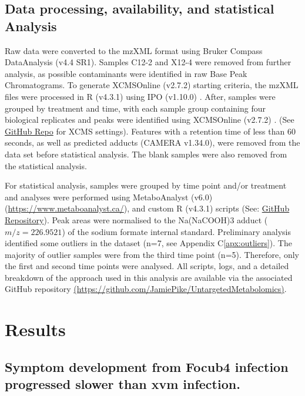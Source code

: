 \subsection{Data processing, availability, and statistical Analysis}
Raw data were converted to the mzXML format using Bruker Compass DataAnalysis (v4.4 SR1). Samples C12-2 and X12-4 were removed from further analysis, as possible contaminants were identified in raw Base Peak Chromatograms. To generate XCMSOnline  (v2.7.2) \parencite{Gowda2014} starting criteria, the mzXML files were processed in R (v4.3.1) \parencite{R} using IPO (v1.10.0) \parencite{Libiseller2015}. After, samples were grouped by treatment and time, with each sample group containing four biological replicates and peaks were identified using  XCMSOnline (v2.7.2) \parencite{Gowda2014}. (See \href{https://github.com/JamiePike/UntargetedMetabolomics/tree/main/NovDec22/XCMS}{GitHub Repo} for XCMS settings). Features with a retention time of less than 60 seconds, as well as predicted adducts (CAMERA v1.34.0), were removed from the data set before statistical analysis. The blank samples were also removed from the statistical analysis.

For statistical analysis, samples were grouped by time point and/or treatment and analyses were performed using MetaboAnalyst (v6.0) (\href{https://www.metaboanalyst.ca/}{https://www.metaboanalyst.ca/}), and custom R (v4.3.1) \parencite{R} scripts (See: \href{https://github.com/JamiePike/UntargetedMetabolomics/tree/main}{GitHub Repository}). Peak areas were normalised to the Na(NaCOOH)3 adduct ($m/z=226.9521$) of the sodium formate internal standard. Preliminary analysis identified some outliers in the dataset (n=7, see Appendix C\ref{apx:outliers}). The majority of outlier samples were from the third time point (n=5). Therefore, only the first and second time points were analysed. All scripts, logs, and a detailed breakdown of the approach used in this analysis are available via the associated GitHub repository \href{https://github.com/JamiePike/UntargetedMetabolomics}{ (https://github.com/JamiePike/UntargetedMetabolomics)}. 

\newpage
\section{Results}

\subsection{Symptom development from \acl{Focub4} infection progressed slower than \acl{xvm} infection.}

